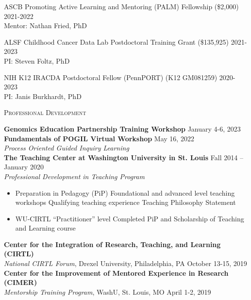 \documentclass[11pt]{article}
\begin{document}
\bigskip

ASCB Promoting Active Learning and Mentoring (PALM) Fellowship (\$2,000) \hfill 2021-2022 \\
Mentor: Nathan Fried, PhD

\bigskip

ALSF Childhood Cancer Data Lab Postdoctoral Training Grant (\$135,925) \hfill 2021-2023 \\
PI: Steven Foltz, PhD

\bigskip

NIH K12 IRACDA Postdoctoral Fellow (PennPORT) (K12 GM081259) \hfill 2020-2023 \\
PI: Janis Burkhardt, PhD

\hrulefill

\bigskip

\textsc{\Large Professional Development}

\bigskip

\textbf{Genomics Education Partnership Training Workshop} \hfill January 4-6, 2023 \\

\textbf{Fundamentals of POGIL Virtual Workshop} \hfill May 16, 2022 \\
\emph{Process Oriented Guided Inquiry Learning} \\

\textbf{The Teaching Center at Washington University in St. Louis} \hfill Fall 2014 -- January 2020 \\
\emph{Professional Development in Teaching Program}
\begin{itemize}
	\item Preparation in Pedagogy (PiP)
		\subitem Foundational and advanced level teaching workshops
		\subitem Qualifying teaching experience
		\subitem Teaching Philosophy Statement
	\item WU-CIRTL ``Practitioner'' level
		\subitem Completed PiP and Scholarship of Teaching and Learning course
\end{itemize}

\textbf{Center for the Integration of Research, Teaching, and Learning (CIRTL)} \\
\emph{National CIRTL Forum}, Drexel University, Philadelphia, PA \hfill October 13-15, 2019 \\

\textbf{Center for the Improvement of Mentored Experience in Research (CIMER)} \\
\emph{Mentorship Training Program}, WashU, St. Louis, MO \hfill April 1-2, 2019 \\
\end{document}
